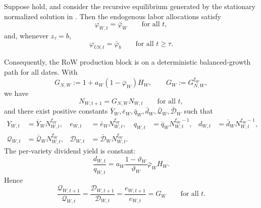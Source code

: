 \documentclass{article}
\begin{document}
\begin{prop}\label{prop_balanced_growth_primitives}
Suppose  hold, and consider the recursive equilibrium generated by the stationary normalized solution in . Then the endogenous labor allocations satisfy
\[
\varphi_{W,t}=\bar\varphi_W\qquad\text{for all }t,
\]
and, whenever $z_\tau=b$,
\[
\varphi_{US,t}=\bar\varphi_b\qquad\text{for all }t\ge \tau.
\]

Consequently, the RoW production block is on a deterministic balanced-growth path for all dates. With
\[
G_{N,W}:=1+a_W(1-\bar\varphi_W)H_W,
\qquad
G_W:=G_{N,W}^{\xi_W},
\]
we have
\begin{equation}\label{bg_w_knowledge_growth}
N_{W,t+1}=G_{N,W}N_{W,t}
\qquad\text{for all }t,
\end{equation}
and there exist positive constants
$\bar Y_W,\bar e_W,\bar q_W,\bar d_W,\bar{\mathcal Q}_W,\bar{\mathcal D}_W$
such that
\begin{align}
Y_{W,t}&=\bar Y_W N_{W,t}^{\xi_W},
&
e_{W,t}&=\bar e_W N_{W,t}^{\xi_W},
&
q_{W,t}&=\bar q_W N_{W,t}^{\xi_W-1},
&
d_{W,t}&=\bar d_W N_{W,t}^{\xi_W-1},
\label{bg_w_per_variety_scaling}\\
\mathcal Q_{W,t}&=\bar{\mathcal Q}_W N_{W,t}^{\xi_W},
&
\mathcal D_{W,t}&=\bar{\mathcal D}_W N_{W,t}^{\xi_W}.
\label{bg_w_scaling}
\end{align}
The per-variety dividend yield is constant:
\begin{equation}\label{bg_w_dividend_yield}
\frac{d_{W,t}}{q_{W,t}}
=
a_W\frac{1-\vartheta_W}{\vartheta_W}\bar\varphi_W H_W.
\end{equation}
Hence
\begin{equation}\label{bg_w_growth_rate}
\frac{\mathcal Q_{W,t+1}}{\mathcal Q_{W,t}}
=
\frac{\mathcal D_{W,t+1}}{\mathcal D_{W,t}}
=
\frac{e_{W,t+1}}{e_{W,t}}
=
G_W
\qquad\text{for all }t.
\end{equation}


\end{prop}
\end{document}
